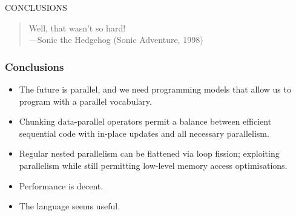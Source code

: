 \documentclass[rgb,dvipsnames]{beamer}
\begin{document}
\begin{frame}
  \begin{center}
    \huge CONCLUSIONS
  \end{center}

\vfill

\begin{quote}
  Well, that wasn't so hard! \\\hfill ---Sonic the Hedgehog (Sonic Adventure, 1998)
\end{quote}
\end{frame}


\begin{frame}
  \frametitle{Conclusions}

  \begin{itemize}
  \item The future is parallel, and we need programming models that
    allow us to program with a parallel vocabulary.

  \item Chunking data-parallel operators permit a balance between
    efficient sequential code with in-place updates and all necessary
    parallelism.

  \item Regular nested parallelism can be flattened via loop fission;
    exploiting parallelism while still permitting low-level memory
    access optimisations.

  \item Performance is decent.

  \item The language seems useful.
  \end{itemize}

\end{frame}
\end{document}
